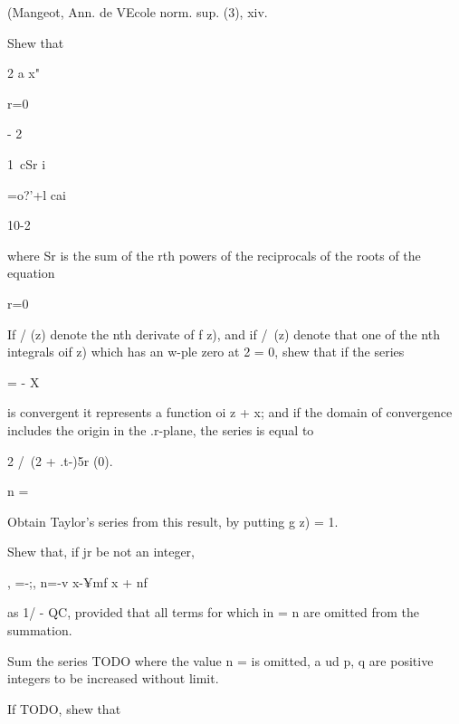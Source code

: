 \begin{wandwmiscexamples}
\begin{wandwmiscexample}
    (Mangeot, Ann. de VEcole norm. sup. (3), xiv.
  \end{wandwmiscexample}
  \begin{wandwmiscexample}
    Shew that

    2 a x"

    r=0

    - 2

    1\ cSr i

    =o?'+l cai

    10-2


    where Sr is the sum of the rth powers of the reciprocals of the roots
    of the equation

    r=0

  \end{wandwmiscexample}
  \begin{wandwmiscexample}
    If / (z) denote the nth derivate of f z), and if /\ (z) denote
    that one of the nth integrals oif z) which has an w-ple zero at 2 = 0,
    shew that if the series

    = - X

    is convergent it represents a function oi z + x; and if the domain of
    convergence includes the origin in the .r-plane, the series is equal
    to


    2 /\ (2 + .t-)5r (0).

    n =

    Obtain Taylor's series from this result, by putting g z) = 1.
  \end{wandwmiscexample}
  \begin{wandwmiscexample}
    Shew that, if jr be not an integer,

    , =-;, n=-v x-¥mf x + nf

    as 1/ - QC, provided that all terms for which in = n are omitted from
    the summation.

  \end{wandwmiscexample}
  \begin{wandwmiscexample}
    Sum the series
    TODO
    where the value n = is omitted, a ud p, q are
    positive integers to be increased without
    limit.

  \end{wandwmiscexample}
  \begin{wandwmiscexample}
    If TODO, shew that


\end{wandwmiscexample}
\end{wandwmiscexamples}
